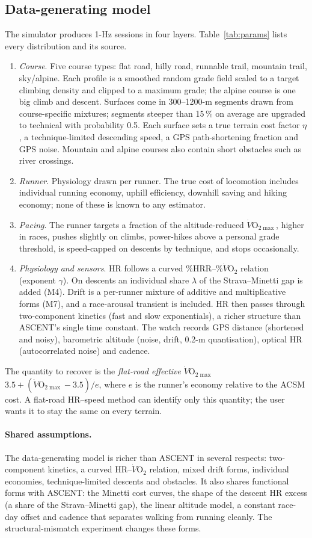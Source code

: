 \documentclass[11pt,a4paper]{article}
\newcommand{\VO}{\ensuremath{\dot V\mathrm{O}_2}}
\newcommand{\VOmax}{\ensuremath{\dot V\mathrm{O}_{2\max}}}
\newcommand{\ascent}{ASCENT}
\begin{document}
\subsection{Data-generating model}
The simulator produces 1-Hz sessions in four layers. Table~\ref{tab:params} lists every distribution and its source.
\begin{enumerate}[leftmargin=*]
\item \emph{Course}. Five course types: flat road, hilly road, runnable trail, mountain trail, sky/alpine. Each profile is a smoothed random grade field scaled to a target climbing density and clipped to a maximum grade; the alpine course is one big climb and descent. Surfaces come in 300--1200-m segments drawn from course-specific mixtures; segments steeper than 15\,\% on average are upgraded to technical with probability 0.5. Each surface sets a true terrain cost factor $\eta$, a technique-limited descending speed, a GPS path-shortening fraction and GPS noise. Mountain and alpine courses also contain short obstacles such as river crossings.
\item \emph{Runner}. Physiology drawn per runner. The true cost of locomotion includes individual running economy, uphill efficiency, downhill saving and hiking economy; none of these is known to any estimator.
\item \emph{Pacing}. The runner targets a fraction of the altitude-reduced \VOmax{}, higher in races, pushes slightly on climbs, power-hikes above a personal grade threshold, is speed-capped on descents by technique, and stops occasionally.
\item \emph{Physiology and sensors}. HR follows a curved \%HRR--\%\VO{} relation (exponent $\gamma$). On descents an individual share $\lambda$ of the Strava--Minetti gap is added (M4). Drift is a per-runner mixture of additive and multiplicative forms (M7), and a race-arousal transient is included. HR then passes through two-component kinetics (fast and slow exponentials), a richer structure than \ascent's single time constant. The watch records GPS distance (shortened and noisy), barometric altitude (noise, drift, 0.2-m quantisation), optical HR (autocorrelated noise) and cadence.
\end{enumerate}
The quantity to recover is the \emph{flat-road effective} \VOmax{} $3.5+(\VOmax-3.5)/e$, where $e$ is the runner's economy relative to the ACSM cost. A flat-road HR--speed method can identify only this quantity; the user wants it to stay the same on every terrain.

\paragraph{Shared assumptions.} The data-generating model is richer than \ascent{} in several respects: two-component kinetics, a curved HR--\VO{} relation, mixed drift forms, individual economies, technique-limited descents and obstacles. It also shares functional forms with \ascent: the Minetti cost curves, the shape of the descent HR excess (a share of the Strava--Minetti gap), the linear altitude model, a constant race-day offset and cadence that separates walking from running cleanly. The structural-mismatch experiment changes these forms.
\end{document}
